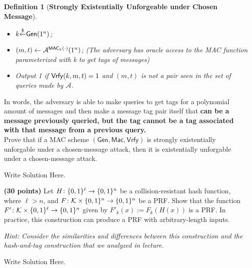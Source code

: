 \documentclass[12pt]{hw}
\newtheorem{definition}{Definition}
\newcommand{\getr}{\ensuremath{{\overset{\$}{\leftarrow}}}\xspace}
\newcommand{\Gen}{\ensuremath{{\sf Gen}}\xspace}
\begin{document}
\begin{exercise}
\begin{definition}[\bf{Strongly Existentially Unforgeable under Chosen Message}]
\begin{mdframed}
    \begin{itemize}
        \item $k \getr \Gen(1^n)$;
        \item $(m, t) \leftarrow \mathcal{A}^{{\sf MAC}_k(\cdot)}(1^n)$; (The adversary has oracle access to the MAC function parameterized with k to get tags of messages)
        \item Output 1 if ${\sf Vrfy}(k,m,t) = 1$ and $(m,t)$ is not a pair seen in the set of queries made by $\mathcal{A}$.
    \end{itemize}
    \end{mdframed}
\end{definition}
In words, the adversary is able to make queries to get tags for a polynomial amount of messages and then make a message tag pair itself that \textbf{can be a message previously queried, but the tag cannot be a tag associated with that message from a previous query.}\\

Prove that if a MAC scheme $(\mathsf{Gen}, \mathsf{Mac}, \mathsf{Vrfy})$ is strongly existentially unforgable under a chosen-message attack, then it is existentially unforgable under a chosen-message attack.
\end{exercise}
\begin{answer}
Write Solution Here.
\end{answer}
\begin{exercise} {\bf (30 points)}
    Let $H\colon \{0,1\}^\ell \to \{0,1\}^n$ be a collision-resistant hash function,
    where $\ell > n$, and $F\colon \mathcal{K} \times \{0,1\}^n \to \{0,1\}^n$ be a PRF.
    Show that the function $F'\colon \mathcal{K} \times \{0,1\}^\ell \to \{0,1\}^n$
    given by $F'_k(x) := F_k(H(x))$ is a PRF.  In practice, this construction
    can produce a PRF with arbitrary-length inputs.
    \smallskip

    \emph{Hint: Consider the similarities and differences between this
    construction and the hash-and-tag construction that we analyzed in lecture.}
\end{exercise}
    
\begin{answer}
Write Solution Here.
\end{answer}
\end{document}
